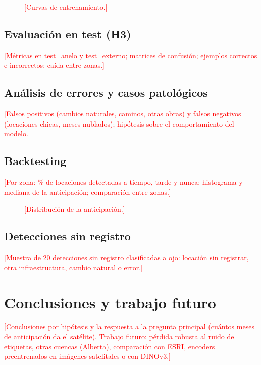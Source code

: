 \documentclass[10pt,a4paper]{article}
\newcommand{\pend}[1]{\textcolor{red}{[#1]}}
\newcommand{\figpend}[1]{\fbox{\parbox[c][3.5cm][c]{0.92\columnwidth}{\centering\small\textcolor{red}{#1}}}}
\begin{document}
\begin{figure}[t]
\centering
\figpend{Figura: curvas de entrenamiento del mejor modelo}
\caption{\pend{Curvas de entrenamiento.}}
\label{fig:curvas}
\end{figure}

\subsection{Evaluación en test (H3)}
\pend{Métricas en test\_anelo y test\_externo; matrices de confusión; ejemplos correctos e incorrectos; caída entre zonas.}

\subsection{Análisis de errores y casos patológicos}
\pend{Falsos positivos (cambios naturales, caminos, otras obras) y falsos negativos (locaciones chicas, meses nublados); hipótesis sobre el comportamiento del modelo.}

\subsection{Backtesting}
\pend{Por zona: \% de locaciones detectadas a tiempo, tarde y nunca; histograma y mediana de la anticipación; comparación entre zonas.}

\begin{figure}[t]
\centering
\figpend{Figura: histograma de la anticipación por zona}
\caption{\pend{Distribución de la anticipación.}}
\label{fig:anticipacion}
\end{figure}

\subsection{Detecciones sin registro}
\pend{Muestra de 20 detecciones sin registro clasificadas a ojo: locación sin registrar, otra infraestructura, cambio natural o error.}


\section{Conclusiones y trabajo futuro}
\pend{Conclusiones por hipótesis y la respuesta a la pregunta principal (cuántos meses de anticipación da el satélite).
Trabajo futuro: pérdida robusta al ruido de etiquetas, otras cuencas (Alberta), comparación con ESRI,
encoders preentrenados en imágenes satelitales o con DINOv3.}
\end{document}
